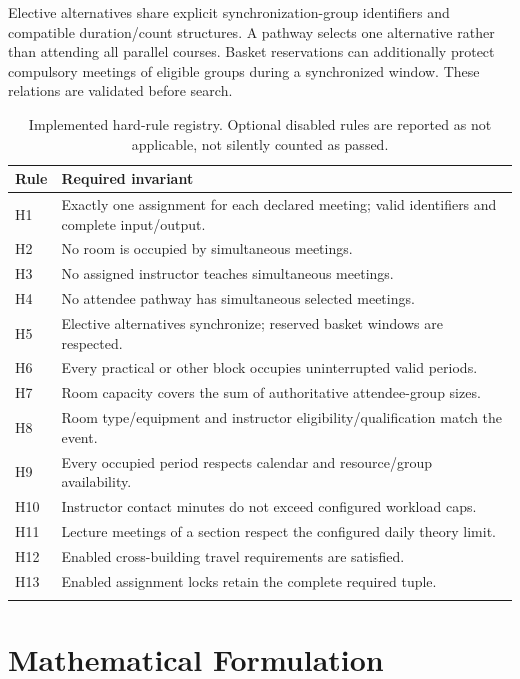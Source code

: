 \documentclass[pdflatex,sn-mathphys-num]{sn-jnl}
\theoremstyle{thmstyleone}
\theoremstyle{thmstyletwo}
\theoremstyle{thmstylethree}
\begin{document}
Elective alternatives share explicit synchronization-group identifiers and compatible duration/count structures. A pathway selects one alternative rather than attending all parallel courses. Basket reservations can additionally protect compulsory meetings of eligible groups during a synchronized window. These relations are validated before search.

\begin{table}[t]
\caption{Implemented hard-rule registry. Optional disabled rules are reported as not applicable, not silently counted as passed.}\label{tab:rules}
\small
\begin{tabularx}{\textwidth}{@{}lX@{}}
\toprule
Rule & Required invariant \\
\midrule
H1 & Exactly one assignment for each declared meeting; valid identifiers and complete input/output. \\
H2 & No room is occupied by simultaneous meetings. \\
H3 & No assigned instructor teaches simultaneous meetings. \\
H4 & No attendee pathway has simultaneous selected meetings. \\
H5 & Elective alternatives synchronize; reserved basket windows are respected. \\
H6 & Every practical or other block occupies uninterrupted valid periods. \\
H7 & Room capacity covers the sum of authoritative attendee-group sizes. \\
H8 & Room type/equipment and instructor eligibility/qualification match the event. \\
H9 & Every occupied period respects calendar and resource/group availability. \\
H10 & Instructor contact minutes do not exceed configured workload caps. \\
H11 & Lecture meetings of a section respect the configured daily theory limit. \\
H12 & Enabled cross-building travel requirements are satisfied. \\
H13 & Enabled assignment locks retain the complete required tuple. \\
\botrule
\end{tabularx}
\end{table}

\section{Mathematical Formulation}\label{sec:model}
\end{document}
